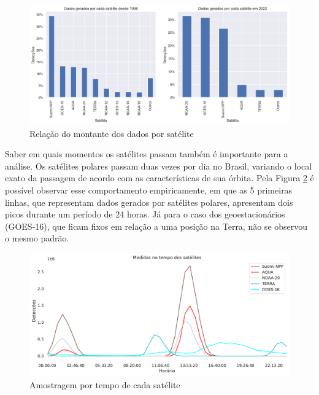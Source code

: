\documentclass[cic,tc]{iiufrgs}
\begin{document}
\begin{figure}[H]
    \caption{Relação do montante dos dados por satélite}
    \begin{center}
        \includegraphics[width=35em]{porcentagem_satelites}
    \end{center}
    \label{fig:porcentagem_satelites}
\end{figure}

Saber em quais momentos os satélites passam também é importante para a análise. Os satélites polares passam duas vezes por dia no Brasil, variando o local exato da passagem de acordo com as características de sua órbita. Pela Figura \ref{fig:tempo_medidas_satelites} é possível observar esse comportamento empiricamente, em que as 5 primeiras linhas, que representam dados gerados por satélites polares, apresentam dois picos durante um período de 24 horas. Já para o  caso dos geoestacionários (GOES-16), que ficam fixos em relação a uma posição na Terra, não se observou o mesmo padrão. \par

\begin{figure}[H]
    \caption{Amostragem por tempo de cada satélite}
    \begin{center}
        \includegraphics[width=35em]{tempo_medidas_satelites}
    \end{center}
    \label{fig:tempo_medidas_satelites}
\end{figure}
\end{document}
